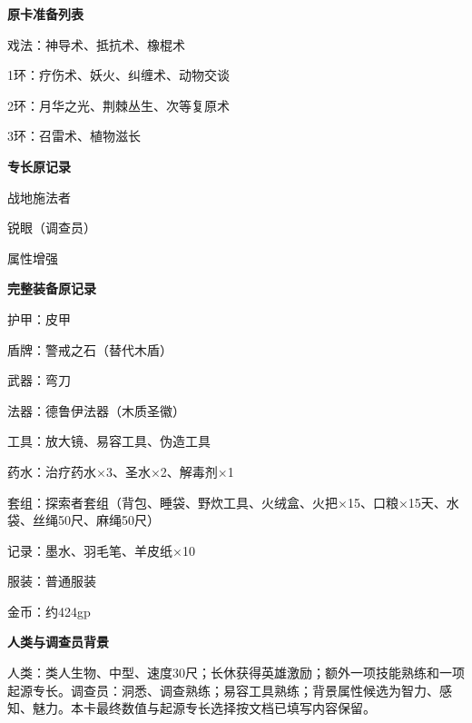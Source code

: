 \documentclass[letterpaper,openany,twoside,twocolumn]{book}
\begin{document}
\par\noindent\textbf{原卡准备列表}\par
戏法：神导术、抵抗术、橡棍术\par
1环：疗伤术、妖火、纠缠术、动物交谈\par
2环：月华之光、荆棘丛生、次等复原术\par
3环：召雷术、植物滋长\par


\par\noindent\textbf{专长原记录}\par
战地施法者\par
锐眼（调查员）\par
属性增强\par


\par\noindent\textbf{完整装备原记录}\par
护甲：皮甲\par
盾牌：警戒之石（替代木盾）\par
武器：弯刀\par
法器：德鲁伊法器（木质圣徽）\par
工具：放大镜、易容工具、伪造工具\par
药水：治疗药水×3、圣水×2、解毒剂×1\par
套组：探索者套组（背包、睡袋、野炊工具、火绒盒、火把×15、口粮×15天、水袋、丝绳50尺、麻绳50尺）\par
记录：墨水、羽毛笔、羊皮纸×10\par
服装：普通服装\par
金币：约424gp\par


\par\noindent\textbf{人类与调查员背景}\par
人类：类人生物、中型、速度30尺；长休获得英雄激励；额外一项技能熟练和一项起源专长。调查员：洞悉、调查熟练；易容工具熟练；背景属性候选为智力、感知、魅力。本卡最终数值与起源专长选择按文档已填写内容保留。\par
\end{document}
